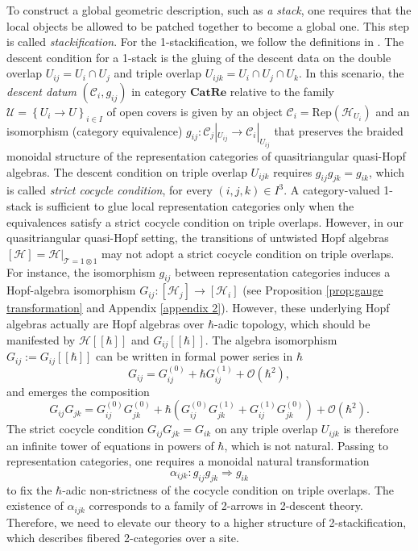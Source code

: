 \documentclass[reqno]{amsart}
\theoremstyle{definition}
\theoremstyle{remark}
\begin{document}
To construct a global geometric description, such as \textit{a stack}, one requires that the local objects be allowed to be patched together to become a global one. This step is called \textit{stackification}. For the 1-stackification, we follow the definitions in \cite{breen2009notes,vistoli2004notes,stacks-project}. The descent condition for a 1-stack is the gluing of the descent data on the double overlap $U_{ij}=U_i \cap U_j$ and triple overlap $U_{ijk}=U_i \cap U_j \cap U_k$. In this scenario, the \textit{descent datum} $\left(\mathcal{C}_i,g_{ij}\right)$ in category $\textbf{CatRe}$ relative to the family $\mathcal{U}=\left\{U_i\longrightarrow U\right\}_{i\in I}$ of open covers is given by an object $\mathcal{C}_i = \text{Rep}(\mathscr{H}_{U_i})$ and an isomorphism (category equivalence) $g_{ij}:\mathcal{C}_j|_{U_{ij}}\longrightarrow \mathcal{C}_i |_{U_{ij}}$ that preserves the braided monoidal structure of the representation categories of quasitriangular quasi-Hopf algebras. The descent condition on triple overlap $U_{ijk}$ requires $g_{ij} g_{jk} = g_{ik}$, which is called \textit{strict cocycle condition}, for every $(i,j,k)\in I^3$. A category-valued 1-stack is sufficient to glue local representation categories only when the equivalences satisfy a strict cocycle condition on triple overlaps. However, in our quasitriangular quasi-Hopf setting, the transitions of untwisted Hopf algebras $\left[\mathscr{H}\right]=\mathscr{H}|_{\mathcal{T}=1\otimes 1}$ may not adopt a strict cocycle condition on triple overlaps. For instance, the isomorphism $g_{ij}$ between representation categories induces a Hopf-algebra isomorphism $G_{ij}:\left[\mathscr{H}_j\right]\longrightarrow\left[\mathscr{H}_i\right]$ (see Proposition \ref{prop:gauge transformation} and Appendix \ref{appendix 2}). However, these underlying Hopf algebras actually are Hopf algebras over $\hbar$-adic topology, which should be manifested by $\mathscr{H}[[\hbar]]$ and $G_{ij}[[\hbar]]$. The algebra isomorphism $G_{ij}:=G_{ij}[[\hbar]]$ can be written in formal power series in $\hbar$
\begin{equation}
    G_{ij} = G_{ij}^{(0)}+\hbar G_{ij}^{(1)}+\mathcal{O}(\hbar^2),
\end{equation}
and emerges the composition
\begin{equation}
    G_{ij}G_{jk} = G_{ij}^{(0)}G_{jk}^{(0)}+\hbar \left(G_{ij}^{(0)}G_{jk}^{(1)}+G_{ij}^{(1)}G_{jk}^{(0)}\right) +\mathcal{O}(\hbar^2).
\end{equation}
The strict cocycle condition $G_{ij}G_{jk} = G_{ik}$ on any triple overlap $U_{ijk}$ is therefore an infinite tower of equations in powers of $\hbar$, which is not natural. Passing to representation categories, one requires a monoidal natural transformation 
\begin{equation}
    \alpha_{ijk}: g_{ij} g_{jk} \Longrightarrow g_{ik}
\end{equation}
to fix the $\hbar$-adic non-strictness of the cocycle condition on triple overlaps. The existence of $\alpha_{ijk}$ corresponds to a family of 2-arrows in 2-descent theory\cite{breen2009notes}. Therefore, we need to elevate our theory to a higher structure of 2-stackification, which describes fibered 2-categories over a site.
\end{document}
